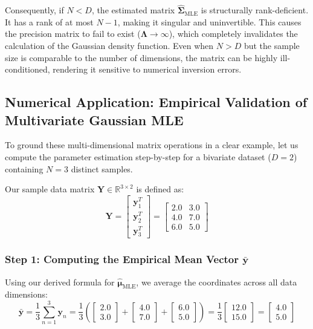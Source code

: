 \documentclass{article}
\begin{document}
Consequently, if $N < D$, the estimated matrix $\hat{\boldsymbol{\Sigma}}_{\text{MLE}}$ is structurally rank-deficient. It has a rank of at most $N-1$, making it singular and uninvertible. This causes the precision matrix to fail to exist ($\boldsymbol{\Lambda} \to \infty$), which completely invalidates the calculation of the Gaussian density function. Even when $N > D$ but the sample size is comparable to the number of dimensions, the matrix can be highly ill-conditioned, rendering it sensitive to numerical inversion errors.

\subsection{Numerical Application: Empirical Validation of Multivariate Gaussian MLE}

To ground these multi-dimensional matrix operations in a clear example, let us compute the parameter estimation step-by-step for a bivariate dataset ($D = 2$) containing $N = 3$ distinct samples.

Our sample data matrix $\mathbf{Y} \in \mathbb{R}^{3 \times 2}$ is defined as:
\begin{equation}
\mathbf{Y} = \begin{bmatrix} \mathbf{y}_1^T \\ \mathbf{y}_2^T \\ \mathbf{y}_3^T \end{bmatrix} = \begin{bmatrix} 2.0 & 3.0 \\ 4.0 & 7.0 \\ 6.0 & 5.0 \end{bmatrix}
\end{equation}

\subsubsection{Step 1: Computing the Empirical Mean Vector $\bar{\mathbf{y}}$}
Using our derived formula for $\hat{\boldsymbol{\mu}}_{\text{MLE}}$, we average the coordinates across all data dimensions:
\begin{equation}
\bar{\mathbf{y}} = \frac{1}{3}\sum_{n=1}^3 \mathbf{y}_n = \frac{1}{3} \left( \begin{bmatrix} 2.0 \\ 3.0 \end{bmatrix} + \begin{bmatrix} 4.0 \\ 7.0 \end{bmatrix} + \begin{bmatrix} 6.0 \\ 5.0 \end{bmatrix} \right) = \frac{1}{3}\begin{bmatrix} 12.0 \\ 15.0 \end{bmatrix} = \begin{bmatrix} \mathbf{4.0} \\ \mathbf{5.0} \end{bmatrix}
\end{equation}
\end{document}
